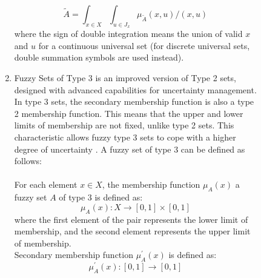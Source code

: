 \documentclass{article}
\begin{document}
\begin{figure}[!t]
\begin{minipage}{0.49\textwidth}
\begin{enumerate}
                $$\tilde{A}=\int_{x\in X}\int_{u\in J_{x}} \mu_{\tilde{A}}(x,u) / (x,u)$$
                where the sign of double integration means the union of valid $x$ and $u$ for a continuous universal set (for discrete universal sets, double summation symbols are used instead).
                \item Fuzzy Sets of Type 3 is an improved version of Type 2 sets, designed with advanced capabilities for uncertainty management. In type 3 sets, the secondary membership function is also a type 2 membership function. This means that the upper and lower limits of membership are not fixed, unlike type 2 sets. This characteristic allows fuzzy type 3 sets to cope with a higher degree of uncertainty \cite{litlink22}. A fuzzy set of type 3 can be defined as follows:\\
                ~\\
                For each element \(x \in X\), the membership function \(\mu_{A}(x)\) a fuzzy set \(A\) of type 3 is defined as:\\
                \[\mu_{A}(x) : X \rightarrow [0,1] \times [0,1]\]
                where the first element of the pair represents the lower limit of membership, and the second element represents the upper limit of membership.\\
                Secondary membership function \(\mu_{A}^{'}(x)\) is defined as:\\
                \[\mu_{A}^{'}(x) : [0,1] \rightarrow [0,1]\]
            \end{enumerate}
            ~\\
            ~\\
            ~\\
            ~\\
            ~\\
            ~\\
            ~\\
            ~\\
            ~\\
            ~\\
            ~\\
            ~\\
            ~\\
            ~\\
            ~\\
            ~\\
            ~\\
            ~\\

\end{minipage}
\end{figure}
\end{document}
